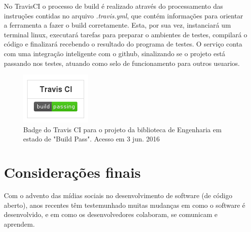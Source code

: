 \documentclass[
	article,			%
	12pt,				%
	oneside,			%
	a4paper,			%
	english,			
	brazil,
	sumario=tradicional
	]{abntex2}
\begin{document}
No TravisCI o processo de build é realizado através do processamento das instruções contidas no arquivo \textit{.travis.yml}, que contém informações para orientar a ferramenta a fazer o build corretamente.
Esta, por sua vez, instanciará um terminal linux, executará tarefas para preparar o ambientes de testes, compilará o código e finalizará recebendo o resultado do programa de testes. O serviço conta com uma integração inteligente com o github, sinalizando se o projeto está passando nos testes, atuando como selo de funcionamento para outros usuarios.

\begin{figure}[!h]
\centering
\includegraphics[scale=1]{images/travisci_badge.png}
\caption{Badge do Travis CI para o projeto da biblioteca de Engenharia em estado de "Build Pass". Acesso em 3 jun. 2016}
\label{travisci_badge}
\end{figure}







% 

\pagebreak
\section*{Considerações finais}
Com o advento das mídias sociais no desenvolvimento de software (de código aberto), anos recentes têm testemunhado muitas mudanças em como o software é desenvolvido, e em como os desenvolvedores colaboram, se comunicam e aprendem.
\end{document}
